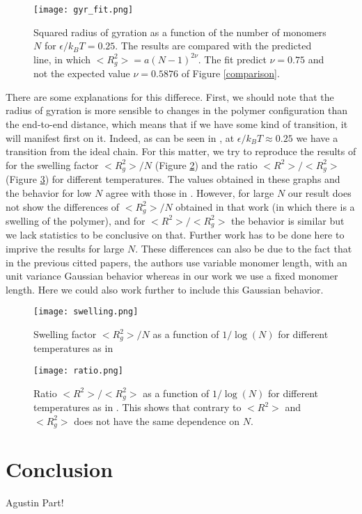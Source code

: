 \documentclass[aps,prl,reprint,groupedaddress]{revtex4-1}
\begin{document}
\begin{figure}[ht]
	\texttt{[image: gyr\_fit.png]}
	\caption{Squared radius of gyration as a function of the number of monomers $N$ for $\epsilon/k_B T = 0.25$. The results are compared with the predicted line, in which $<R_g^2> = a(N-1)^{2 \nu}$. The fit predict $\nu = 0.75$ and not the expected value $\nu = 0.5876$ of Figure \ref{comparison}. \label{gyr_fit}}
\end{figure}

There are some explanations for this differece. First, we should note that the radius of gyration is more sensible to changes in the polymer configuration than the end-to-end distance, which means that if we have some kind of transition, it will manifest first on it. Indeed, as can be seen in \cite{Witt1996}, at $\epsilon/k_B T \approx 0.25$ we have a transition from the ideal chain. For this matter, we try to reproduce the results of \cite{Grassberger1997} for the swelling factor $<R_g^2>/N$ (Figure \ref{swell}) and the ratio $<R^2>/<R_g^2>$ (Figure \ref{ratio}) for different temperatures. The values obtained in these graphs and the behavior for low $N$ agree with those in \cite{Grassberger1997}. However, for large $N$ our result does not show the differences of $<R_g^2>/N$ obtained in that work (in which there is a swelling of the polymer), and for $<R^2>/<R_g^2>$ the behavior is similar but we lack statistics to be conclusive on that. Further work has to be done here to imprive the results for large $N$. These differences can also be due to the fact that in the previous citted papers, the authors use variable monomer length, with an unit variance Gaussian behavior whereas in our work we use a fixed monomer length. Here we could also work further to include this Gaussian behavior. 

\begin{figure}[ht]
	\texttt{[image: swelling.png]}
	\caption{Swelling factor $<R_g^2>/N$ as a function of $1/\log(N)$ for different temperatures as in \cite{Grassberger1997} \label{swell}}
\end{figure}

\begin{figure}[ht]
	\texttt{[image: ratio.png]}
	\caption{Ratio $<R^2>/<R_g^2>$ as a function of $1/\log(N)$ for different temperatures as in \cite{Grassberger1997}. This shows that contrary to \cite{Smith1975} $<R^2>$ and $<R_g^2>$ does not have the same dependence on $N$. \label{ratio}}
\end{figure}

\section{Conclusion \label{conclusion}}
Agustin Part!


\end{document}

